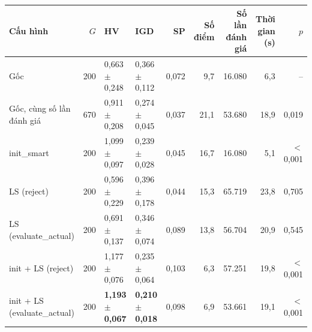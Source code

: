 \begin{tabular}{@{}lrllrrrrr@{}}
\toprule
Cấu hình & $G$ & HV & IGD & SP & Số điểm & Số lần đánh giá & Thời gian (s) & $p$ \\
\midrule
Gốc & 200 & 0{,}663 $\pm$ 0{,}248 & 0{,}366 $\pm$ 0{,}112 & 0{,}072 & 9{,}7 & 16.080 & 6{,}3 & -- \\
Gốc, cùng số lần đánh giá & 670 & 0{,}911 $\pm$ 0{,}208 & 0{,}274 $\pm$ 0{,}045 & 0{,}037 & 21{,}1 & 53.680 & 18{,}9 & 0{,}019 \\
init\_smart & 200 & 1{,}099 $\pm$ 0{,}097 & 0{,}239 $\pm$ 0{,}028 & 0{,}045 & 16{,}7 & 16.080 & 5{,}1 & $<$0{,}001 \\
LS (reject) & 200 & 0{,}596 $\pm$ 0{,}229 & 0{,}396 $\pm$ 0{,}178 & 0{,}044 & 15{,}3 & 65.719 & 23{,}8 & 0{,}705 \\
LS (evaluate\_actual) & 200 & 0{,}691 $\pm$ 0{,}137 & 0{,}346 $\pm$ 0{,}074 & 0{,}089 & 13{,}8 & 56.704 & 20{,}9 & 0{,}545 \\
init + LS (reject) & 200 & 1{,}177 $\pm$ 0{,}076 & 0{,}235 $\pm$ 0{,}064 & 0{,}103 & 6{,}3 & 57.251 & 19{,}8 & $<$0{,}001 \\
init + LS (evaluate\_actual) & 200 & \textbf{1{,}193 $\pm$ 0{,}067} & \textbf{0{,}210 $\pm$ 0{,}018} & 0{,}098 & 6{,}9 & 53.661 & 19{,}1 & $<$0{,}001 \\
\bottomrule
\end{tabular}
